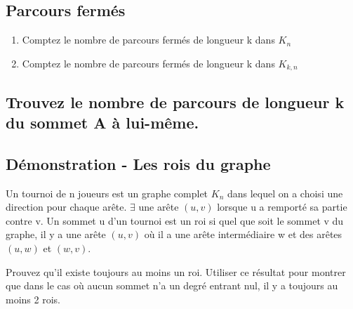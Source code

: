 \subsection{Parcours fermés}
\begin{enumerate}
\item{Comptez le nombre de parcours fermés de longueur k dans $K_{n}$}
\item{Comptez le nombre de parcours fermés de longueur k dans $K_{k,n}$}
\end{enumerate}

\subsection{Trouvez le nombre de parcours de longueur k du sommet A à lui-même.}

\subsection{Démonstration - Les rois du graphe}
Un tournoi de n joueurs est un graphe complet $K_{n}$ dans lequel on a choisi une direction pour chaque arête. $\exists$ une arête $(u,v)$ lorsque u a remporté sa partie contre v. Un sommet u d'un tournoi est un roi si quel que soit le sommet v du graphe, il y a une arête $(u,v)$ où il a une arête intermédiaire w et des arêtes $(u,w)$ et $(w,v)$.

Prouvez qu'il existe toujours au moins un roi.
Utiliser ce résultat pour montrer que dans le cas où aucun sommet n'a un degré entrant nul, il y a toujours au moins 2 rois.


